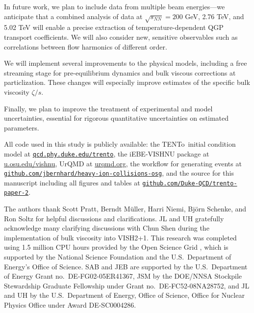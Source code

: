 \documentclass[aps,prc,reprint,amsmath,nofootinbib]{revtex4-1}
\newcommand{\trento}{T\raisebox{-0.5ex}{R}ENTo}
\newcommand{\sqrts}{\sqrt{s_{NN}}}
\begin{document}
In future work, we plan to include data from multiple beam energies---we anticipate that a combined analysis of data at $\sqrts = 200$ GeV, 2.76 TeV, and 5.02 TeV will enable a precise extraction of temperature-dependent QGP transport coefficients.
We will also consider new, sensitive observables such as correlations between flow harmonics of different order.

We will implement several improvements to the physical models, including a free streaming stage for pre-equilibrium dynamics and bulk viscous corrections at particlization.
These changes will especially improve estimates of the specific bulk viscosity $\zeta/s$.

Finally, we plan to improve the treatment of experimental and model uncertainties, essential for rigorous quantitative uncertainties on estimated parameters.

\vspace*{\baselineskip}

\newcommand{\nicelink}[2][http]{\mbox{\href{#1://#2}{\nolinkurl{#2}}}}

All code used in this study is publicly available:
the \trento\ initial condition model at \nicelink{qcd.phy.duke.edu/trento},
the iEBE-VISHNU package at \url{u.osu.edu/vishnu},
UrQMD at \url{urqmd.org},
the workflow for generating events at \nicelink[https]{github.com/jbernhard/heavy-ion-collisions-osg},
and the source for this manuscript including all figures and tables at \nicelink[https]{github.com/Duke-QCD/trento-paper-2}.

\begin{acknowledgments}
The authors thank Scott Pratt, Berndt M\"uller, Harri Niemi, Bj\"orn Schenke, and Ron Soltz for helpful discussions and clarifications.
JL and UH gratefully acknowledge many clarifying discussions with Chun Shen during the implementation of bulk viscosity into VISH2+1.
This research was completed using 1.5 million CPU hours provided by the Open Science Grid \cite{Pordes:2007zzb,Sfiligoi:2010zz}, which is supported by the National Science Foundation and the U.S.\ Department of Energy's Office of Science.
SAB and JEB are supported by the U.S.\ Department of Energy Grant no.~DE-FG02-05ER41367,
JSM by the DOE/NNSA Stockpile Stewardship Graduate Fellowship under Grant no.~DE-FC52-08NA28752,
and JL and UH by the U.S.\ Department of Energy, Office of Science, Office for Nuclear Physics Office under Award DE-SC0004286.
\end{acknowledgments}


\end{document}
